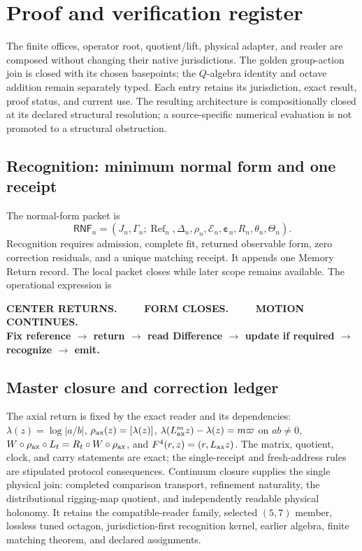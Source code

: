 \documentclass[10pt]{article}
\begin{document}
\section{Proof and verification register}
The finite offices, operator root, quotient/lift, physical adapter, and reader are composed without changing their native jurisdictions. The golden group-action join is closed with its chosen basepoints; the $Q$-algebra identity and octave addition remain separately typed. Each entry retains its jurisdiction, exact result, proof status, and current use. The resulting architecture is compositionally closed at its declared structural resolution; a source-specific numerical evaluation is not promoted to a structural obstruction.

\subsection{Recognition: minimum normal form and one receipt}
The normal-form packet is
\begin{equation}
\mathsf{RNF}_n=(J_n,\Gamma_n;\operatorname{Ref}_n,\Delta_n,\rho_n,
\mathcal E_n,\boldsymbol\varepsilon_n,R_n,\theta_n,\Theta_n).
\end{equation}
Recognition requires admission, complete fit, returned observable form, zero correction residuals, and a unique matching receipt. It appends one Memory Return record. The local packet closes while later scope remains available. The operational expression is
\begin{center}\bfseries
CENTER RETURNS. $\qquad$ FORM CLOSES. $\qquad$ MOTION CONTINUES.\\
\normalfont Fix reference $\to$ return $\to$ read Difference $\to$ update if required $\to$ recognize $\to$ emit.
\end{center}

\subsection{Master closure and correction ledger}
The axial return is fixed by the exact reader and its dependencies:
$\lambda(z)=\log|a/b|$, $\rho_{\rm ax}(z)=[\lambda(z)]$,
$\lambda(L_{\rm ax}^m z)-\lambda(z)=m\varpi$ on $ab\ne0$,
$W\circ\rho_{\rm ax}\circ L_t=R_t\circ W\circ\rho_{\rm ax}$, and
$F^4(r,z)=(r,L_{\rm ax}z)$. The matrix, quotient, clock, and carry
statements are exact; the single-receipt
and fresh-address rules are stipulated protocol consequences.
Continuum closure supplies the single physical join: completed
comparison transport, refinement naturality, the distributional rigging-map
quotient, and independently readable physical holonomy. It retains the
compatible-reader family, selected $(5,7)$ member, lossless tuned octagon,
jurisdiction-first recognition kernel, earlier algebra, finite matching
theorem, and declared assignments.
\end{document}
